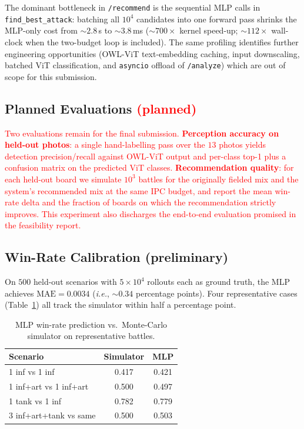 \documentclass[10pt,twocolumn,letterpaper]{article}
\newcommand{\red}[1]{\textcolor{red}{#1}}
\newcommand{\planned}{\textcolor{red}{(planned)}}
\begin{document}
The dominant bottleneck in \texttt{/recommend} is the sequential
MLP calls in \texttt{find\_best\_attack}: batching all $10^{4}$
candidates into one forward pass shrinks the MLP-only cost from
$\sim\!2.8$\,s to $\sim\!3.8$\,ms ($\sim\!700{\times}$ kernel
speed-up; $\sim\!112{\times}$ wall-clock when the two-budget loop
is included). The same profiling identifies further engineering opportunities
(OWL-ViT text-embedding caching, input downscaling, batched ViT
classification, and \texttt{asyncio} offload of \texttt{/analyze})
which are out of scope for this submission.

\subsection{Planned Evaluations \planned}
\label{sec:planned-eval}
\red{Two evaluations remain for the final submission.
\textbf{Perception accuracy on held-out photos}: a single
hand-labelling pass over the $13$ photos yields detection
precision/recall against OWL-ViT output and per-class top-1 plus a
confusion matrix on the predicted ViT classes.
\textbf{Recommendation quality}: for each held-out board we
simulate $10^{3}$ battles for the originally fielded mix and the
system's recommended mix at the same IPC budget, and report the
mean win-rate delta and the fraction of boards on which the
recommendation strictly improves. This experiment also discharges
the end-to-end evaluation promised in the feasibility report.}

\subsection{Win-Rate Calibration (preliminary)}
\label{sec:winrate-calib}
On $500$ held-out scenarios with $5\!\times\!10^{4}$ rollouts each
as ground truth, the MLP achieves $\mathrm{MAE} = 0.0034$
(\emph{i.e.}, $\sim\!0.34$ percentage points). Four representative
cases (Table~\ref{tab:mlp-rep}) all track the simulator within half
a percentage point.

\begin{table}[t]
\centering\small
\setlength{\tabcolsep}{4pt}
\caption{MLP win-rate prediction vs.\ Monte-Carlo simulator on
representative battles.}
\label{tab:mlp-rep}
\begin{tabular}{@{}lcc@{}}
\toprule
Scenario & Simulator & MLP \\
\midrule
1 inf vs 1 inf                     & 0.417 & 0.421 \\
1 inf+art vs 1 inf+art             & 0.500 & 0.497 \\
1 tank vs 1 inf                    & 0.782 & 0.779 \\
3 inf+art+tank vs same             & 0.500 & 0.503 \\
\bottomrule
\end{tabular}
\end{table}
\end{document}
